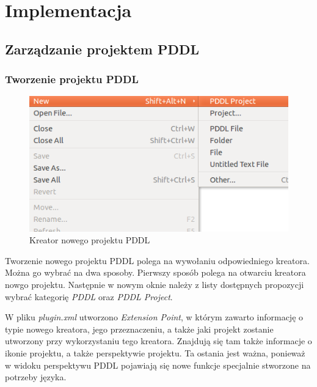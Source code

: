 \chapter{Implementacja}
\section{Zarządzanie projektem PDDL}
\subsection{Tworzenie projektu PDDL}
\begin{figure}[h]
  \centering
    \includegraphics{img/new-project.png}
    \caption{Kreator nowego projektu PDDL}
    \label{ana_structure}
\end{figure}
Tworzenie nowego projektu PDDL polega na wywołaniu odpowiedniego kreatora. Można go wybrać na dwa sposoby. Pierwszy sposób polega na otwarciu kreatora nowgo projektu. Następnie w nowym oknie należy z listy dostępnych propozycji wybrać kategorię \emph{PDDL} oraz \emph{PDDL Project}. 

W pliku \emph{plugin.xml} utworzono \emph{Extension Point}, w którym zawarto informację o typie nowego kreatora, jego przeznaczeniu, a także jaki projekt zostanie utworzony przy wykorzystaniu tego kreatora. Znajdują się tam także informacje o ikonie projektu, a także perspektywie projektu. Ta ostania jest ważna, ponieważ w widoku perspektywu PDDL pojawiają się nowe funkcje specjalnie stworzone na potrzeby języka. 

